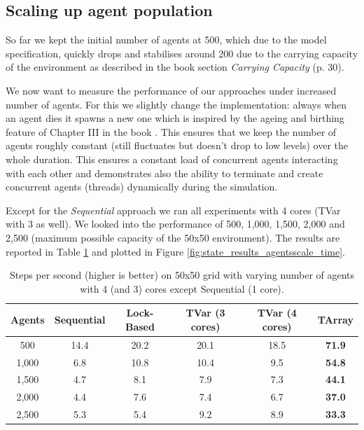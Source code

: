 \subsection{Scaling up agent population}
So far we kept the initial number of agents at 500, which due to the model specification, quickly drops and stabilises around 200 due to the carrying capacity of the environment as described in the book \cite{epstein_growing_1996} section \textit{Carrying Capacity} (p. 30).

We now want to measure the performance of our approaches under increased number of agents. For this we slightly change the implementation: always when an agent dies it spawns a new one which is inspired by the ageing and birthing feature of Chapter III in the book \cite{epstein_growing_1996}. This ensures that we keep the number of agents roughly constant (still fluctuates but doesn't drop to low levels) over the whole duration. This ensures a constant load of concurrent agents interacting with each other and demonstrates also the ability to terminate and create concurrent agents (threads) dynamically during the simulation.

Except for the \textit{Sequential} approach we ran all experiments with 4 cores (TVar with 3 as well). We looked into the performance of 500, 1,000, 1,500, 2,000 and 2,500 (maximum possible capacity of the 50x50 environment). The results are reported in Table \ref{tab:state_results_agentsscale_time} and plotted in Figure \ref{fig:state_results_agentsscale_time}.

\begin{table}
	\centering
  	\begin{tabular}{ c || c | c | c | c | c }
        Agents  & Sequential & Lock-Based & TVar (3 cores) & TVar (4 cores) & TArray  \\ \hline \hline 
    	    500     & 14.4       & 20.2		  &	20.1           & 18.5       	& \textbf{71.9}    \\ \hline
   		1,000   & 6.8        & 10.8 	      & 10.4           & 9.5         & \textbf{54.8}    \\ \hline
   		1,500   & 4.7        & 8.1 		  & 7.9            & 7.3			& \textbf{44.1}    \\ \hline
   		2,000   & 4.4        & 7.6 		  & 7.4            & 6.7    		& \textbf{37.0}    \\ \hline 
   		2,500   & 5.3        & 5.4 		  & 9.2            & 8.9			& \textbf{33.3}    \\ \hline \hline
   	\end{tabular}
  	
  	\caption{Steps per second (higher is better) on 50x50 grid with varying number of agents with 4 (and 3) cores except Sequential (1 core).}
	\label{tab:state_results_agentsscale_time}
\end{table}

